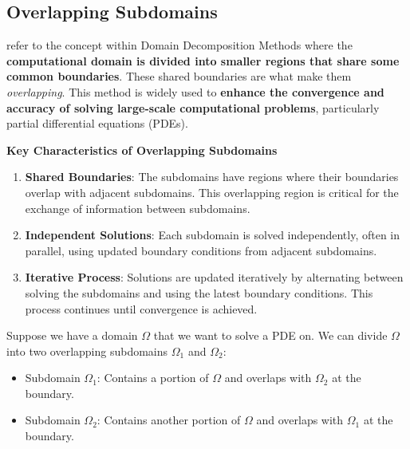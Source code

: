 \subsection{Overlapping Subdomains}

 refer to the concept within Domain Decomposition Methods where the \textbf{computational domain is divided into smaller regions that share some common boundaries}. These shared boundaries are what make them \emph{overlapping}. This method is widely used to \textbf{enhance the convergence and accuracy of solving large-scale computational problems}, particularly partial differential equations (PDEs).

\highspace
\begin{flushleft}
    \textcolor{Green3}{ \textbf{Key Characteristics of Overlapping Subdomains}}
\end{flushleft}
\begin{enumerate}
    \item \textbf{Shared Boundaries}: The subdomains have regions where their boundaries overlap with adjacent subdomains. This overlapping region is critical for the exchange of information between subdomains.
    \item \textbf{Independent Solutions}: Each subdomain is solved independently, often in parallel, using updated boundary conditions from adjacent subdomains.
    \item \textbf{Iterative Process}: Solutions are updated iteratively by alternating between solving the subdomains and using the latest boundary conditions. This process continues until convergence is achieved.
\end{enumerate}

\begin{examplebox}
    Suppose we have a domain $\Omega$ that we want to solve a PDE on. We can divide $\Omega$ into two overlapping subdomains $\Omega_{1}$ and $\Omega_{2}$:
    \begin{itemize}
        \item Subdomain $\Omega_{1}$: Contains a portion of $\Omega$ and overlaps with $\Omega_{2}$ at the boundary.
        \item Subdomain $\Omega_{2}$: Contains another portion of $\Omega$ and overlaps with $\Omega_{1}$ at the boundary.
    \end{itemize}
\end{examplebox}

